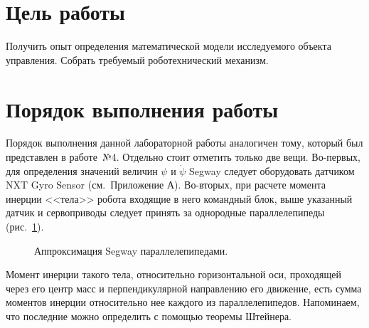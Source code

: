 \newpage
\section{Цель работы}
\hspace*{\parindent}Получить опыт определения математической модели исследуемого объекта управления.
Собрать требуемый роботехнический механизм.

\section{Порядок выполнения работы}
\hspace*{\parindent}Порядок выполнения данной лабораторной работы аналогичен тому, который был представлен в работе~№4.
Отдельно стоит отметить только две вещи.
Во-первых, для определения значений величин $\psi$ и $\dot\psi$ Segway следует оборудовать датчиком NXT Gyro Sensor (см.~Приложение А).
Во-вторых, при расчете момента инерции <<тела>> робота входящие в него командный блок, выше указанный датчик и сервоприводы следует принять за однородные параллелепипеды (рис.~\ref{paraps}).

\begin{figure}[h]
	\noindent{}
	\caption{Аппроксимация Segway параллелепипедами.}
	\label{paraps}
\end{figure}

Момент инерции такого тела, относительно горизонтальной оси, проходящей через его центр масс и перпендикулярной направлению его движение, есть сумма моментов инерции относительно нее каждого из параллелепипедов. 
Напоминаем, что последние можно определить с помощью теоремы Штейнера. 

